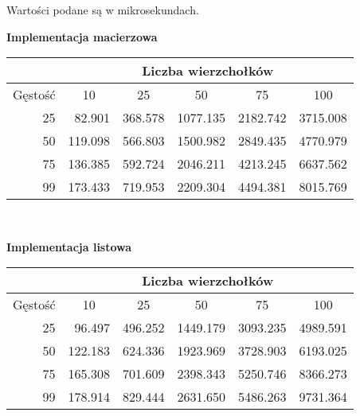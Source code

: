 \documentclass[12pt]{article}
\begin{document}
Wartości podane są w mikrosekundach.

\textbf{Implementacja macierzowa} \\
\begin{center}
\begin{tabular}{|r|r|r|r|r|r|}
\hline
\multicolumn{1}{|c|}{}        & \multicolumn{5}{c|}{Liczba wierzchołków}                                                                                         \\ \hline
\multicolumn{1}{|c|}{Gęstość} & \multicolumn{1}{c|}{10} & \multicolumn{1}{c|}{25} & \multicolumn{1}{c|}{50} & \multicolumn{1}{c|}{75} & \multicolumn{1}{c|}{100} \\ \hline
25                            & 82.901                  & 368.578                 & 1077.135                & 2182.742                & 3715.008                 \\ \hline
50                            & 119.098                 & 566.803                 & 1500.982                & 2849.435                & 4770.979                 \\ \hline
75                            & 136.385                 & 592.724                 & 2046.211                & 4213.245                & 6637.562                 \\ \hline
99                            & 173.433                 & 719.953                 & 2209.304                & 4494.381                & 8015.769                 \\ \hline
\end{tabular}
\end{center}
\\
\vspace{10mm}

\textbf{Implementacja listowa}\\

\begin{center}
\begin{tabular}{|r|r|r|r|r|r|}
\hline
\multicolumn{1}{|c|}{}        & \multicolumn{5}{c|}{Liczba wierzchołków}                                                                                         \\ \hline
\multicolumn{1}{|c|}{Gęstość} & \multicolumn{1}{c|}{10} & \multicolumn{1}{c|}{25} & \multicolumn{1}{c|}{50} & \multicolumn{1}{c|}{75} & \multicolumn{1}{c|}{100} \\ \hline
25                  & 96.497  & 496.252 & 1449.179 & 3093.235 & 4989.591 \\ \hline
50                  & 122.183 & 624.336 & 1923.969 & 3728.903 & 6193.025 \\ \hline
75                  & 165.308 & 701.609 & 2398.343 & 5250.746 & 8366.273 \\ \hline
99                  & 178.914 & 829.444 & 2631.650 & 5486.263 & 9731.364 \\ \hline
\end{tabular}
\end{center}
\end{document}
